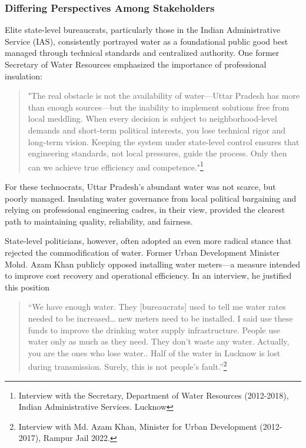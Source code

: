 \subsubsection{\textbf{Differing Perspectives Among Stakeholders}
}
Elite state-level bureaucrats, particularly those in the Indian Administrative Service (IAS), consistently portrayed water as a foundational public good best managed through technical standards and centralized authority. One former Secretary of Water Resources emphasized the importance of professional insulation:

\begin{quote} "The real obstacle is not the availability of water—Uttar Pradesh has more than enough sources—but the inability to implement solutions free from local meddling. When every decision is subject to neighborhood-level demands and short-term political interests, you lose technical rigor and long-term vision. Keeping the system under state-level control ensures that engineering standards, not local pressures, guide the process. Only then can we achieve true efficiency and competence."\footnote{Interview with the Secretary, Department of Water Resources (2012-2018), Indian Administrative Services. Lucknow}
\end{quote}

For these technocrats, Uttar Pradesh’s abundant water was not scarce, but poorly managed. Insulating water governance from local political bargaining and relying on professional engineering cadres, in their view, provided the clearest path to maintaining quality, reliability, and fairness.

State-level politicians, however, often adopted an even more radical stance that rejected the commodification of water. Former Urban Development Minister Mohd. Azam Khan publicly opposed installing water meters—a measure intended to improve cost recovery and operational efficiency. In an interview, he justified this position

\begin{quote} “We have enough water. They [bureaucrats] used to tell me water rates needed to be increased… new meters need to be installed. I said use these funds to improve the drinking water supply infrastructure. People use water only as much as they need. They don’t waste any water. Actually, you are the ones who lose water.. Half of the water in Lucknow is lost during transmission. Surely, this is not people’s fault.”\footnote{Interview with Md. Azam Khan, Minister for Urban Development (2012-2017), Rampur Jail 2022.}

\end{quote}

